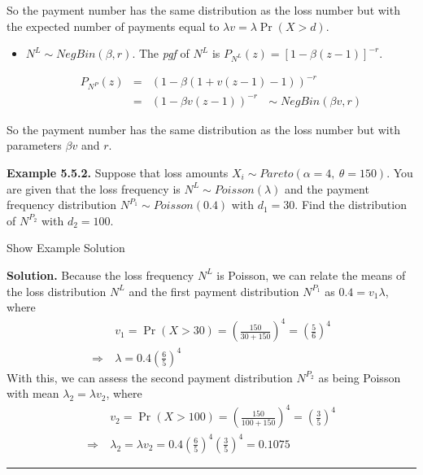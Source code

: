\documentclass[]{book}
\providecommand{\tightlist}{%
  \setlength{\itemsep}{0pt}\setlength{\parskip}{0pt}}
\theoremstyle{definition}
\theoremstyle{definition}
\theoremstyle{definition}
\theoremstyle{remark}
\begin{document}
So the payment number has the same distribution as the loss number but
with the expected number of payments equal to
\(\lambda v = \lambda \Pr(X>d)\).

\begin{itemize}
\tightlist
\item
  \(N^L \sim NegBin(\beta, r)\). The \emph{pgf} of \(N^L\) is
  \(P_{N^{L}}\left( z\right) =\left[ 1-\beta \left( z-1\right)\right]^{-r}\).

  \begin{eqnarray*}
  P_{N^P}(z)&=&\left( 1-\beta (1+v(z-1)-1)\right)^{-r}\\
  &=&\left( 1-\beta v(z-1)\right)^{-r} \:\:\:\sim NegBin(\beta v, r)
  \end{eqnarray*}
\end{itemize}

So the payment number has the same distribution as the loss number but
with parameters \(\beta v\) and \(r\).

\textbf{Example 5.5.2.} Suppose that loss amounts
\(X_i\sim Pareto(\alpha=4,\ \theta=150)\). You are given that the loss
frequency is \(N^L\sim Poisson(\lambda)\) and the payment frequency
distribution \(N^{P_1}\sim Poisson (0.4)\) with \(d_1=30\). Find the
distribution of \(N^{P_2}\) with \(d_2=100\).

Show Example Solution

\hypertarget{toggleExampleAggLoss.5.2}{}
\textbf{Solution.} Because the loss frequency \(N^L\) is Poisson, we can
relate the means of the loss distribution \(N^L\) and the first payment
distribution \(N^{P_1}\) as \(0.4 = v_1 \lambda\), where
\[\begin{aligned}
&v_1 = \Pr(X > 30) = \left( \frac{150}{30+150}\right)^4=\left( \frac{5}{6}\right)^4 \\
\Rightarrow \ & \lambda = 0.4 \left( \frac{6}{5} \right)^4
\end{aligned}\] With this, we can assess the second payment distribution
\(N^{P_2}\) as being Poisson with mean \(\lambda_2 = \lambda v_2\),
where \[\begin{aligned}
& v_2 = \Pr(X>100)=\left( \frac{150}{100+150}\right)^4=\left( \frac{3}{5}\right)^4 \\
\Rightarrow \ & \lambda_2 = \lambda v_2 = 0.4\left( \frac{6}{5} \right)^4 \left( \frac{3}{5} \right)^4 = 0.1075
\end{aligned}\]

\begin{center}\rule{0.5\linewidth}{\linethickness}\end{center}
\end{document}

